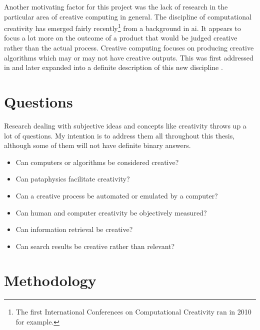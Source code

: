 

Another motivating factor for this project was the lack of research in the particular area of creative computing in general. The discipline of computational creativity has emerged fairly recently\footnote{The first International Conferences on Computational Creativity ran in 2010 for example.} from a background in \gls{ai}. It appears to focus a lot more on the outcome of a product that would be judged creative rather than the actual process. Creative computing focuses on producing creative algorithms which may or may not have creative outputs. This was first addressed in \autocite{Raczinski2013} and later expanded into a definite description of this new discipline \autocite{Hugill2013c}.


\section{Questions}

Research dealing with subjective ideas and concepts like creativity throws up a lot of questions. My intention is to address them all throughout this thesis, although some of them will not have definite binary answers.


\begin{itemize}
  \item Can computers or algorithms be considered creative?
  \item Can pataphysics facilitate creativity?
  \item Can a creative process be automated or emulated by a computer?
  \item Can human and computer creativity be objectively measured?
  \item Can information retrieval be creative?
  \item Can search results be creative rather than relevant?
\end{itemize}


\section{Methodology}
\label{s:intromethod}

